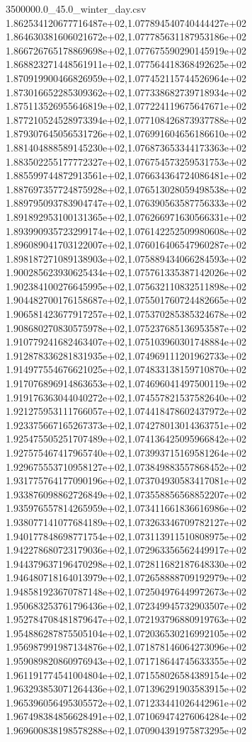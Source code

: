 \begin{filecontents*}{3500000.0_45.0_winter_day.csv}
1.862534120677716487e+02,1.077894540740444427e+02
1.864630381606021672e+02,1.077785631187953186e+02
1.866726765178869698e+02,1.077675590290145919e+02
1.868823271448561911e+02,1.077564418368492625e+02
1.870919900466826959e+02,1.077452115744526964e+02
1.873016652285309362e+02,1.077338682739718934e+02
1.875113526955646819e+02,1.077224119675647671e+02
1.877210524528973394e+02,1.077108426873937788e+02
1.879307645056531726e+02,1.076991604656186610e+02
1.881404888589145230e+02,1.076873653344173363e+02
1.883502255177772327e+02,1.076754573259531753e+02
1.885599744872913561e+02,1.076634364724086481e+02
1.887697357724875928e+02,1.076513028059498538e+02
1.889795093783904747e+02,1.076390563587756333e+02
1.891892953100131365e+02,1.076266971630566331e+02
1.893990935723299174e+02,1.076142252509980608e+02
1.896089041703122007e+02,1.076016406547960287e+02
1.898187271089138903e+02,1.075889434066284593e+02
1.900285623930625434e+02,1.075761335387142026e+02
1.902384100276645995e+02,1.075632110832511898e+02
1.904482700176158687e+02,1.075501760724482665e+02
1.906581423677917257e+02,1.075370285385324678e+02
1.908680270830575978e+02,1.075237685136953587e+02
1.910779241682463407e+02,1.075103960301748884e+02
1.912878336281831935e+02,1.074969111201962733e+02
1.914977554676621025e+02,1.074833138159710870e+02
1.917076896914863653e+02,1.074696041497500119e+02
1.919176363044040272e+02,1.074557821537582640e+02
1.921275953111766057e+02,1.074418478602437972e+02
1.923375667165267373e+02,1.074278013014363751e+02
1.925475505251707489e+02,1.074136425095966842e+02
1.927575467417965740e+02,1.073993715169581264e+02
1.929675553710958127e+02,1.073849883557868452e+02
1.931775764177090196e+02,1.073704930583417081e+02
1.933876098862726849e+02,1.073558856568852207e+02
1.935976557814265959e+02,1.073411661836616986e+02
1.938077141077684189e+02,1.073263346709782127e+02
1.940177848698771754e+02,1.073113911510808975e+02
1.942278680723179036e+02,1.072963356562449917e+02
1.944379637196470298e+02,1.072811682187648330e+02
1.946480718164013979e+02,1.072658888709192979e+02
1.948581923670787148e+02,1.072504976449972673e+02
1.950683253761796436e+02,1.072349945732903507e+02
1.952784708481879647e+02,1.072193796880919763e+02
1.954886287875505104e+02,1.072036530216992105e+02
1.956987991987134876e+02,1.071878146064273096e+02
1.959089820860976943e+02,1.071718644745633355e+02
1.961191774541004804e+02,1.071558026584389154e+02
1.963293853071264436e+02,1.071396291903583915e+02
1.965396056495305572e+02,1.071233441026442961e+02
1.967498384856628491e+02,1.071069474276064284e+02
1.969600838198578288e+02,1.070904391975873295e+02

\end{filecontents*}
